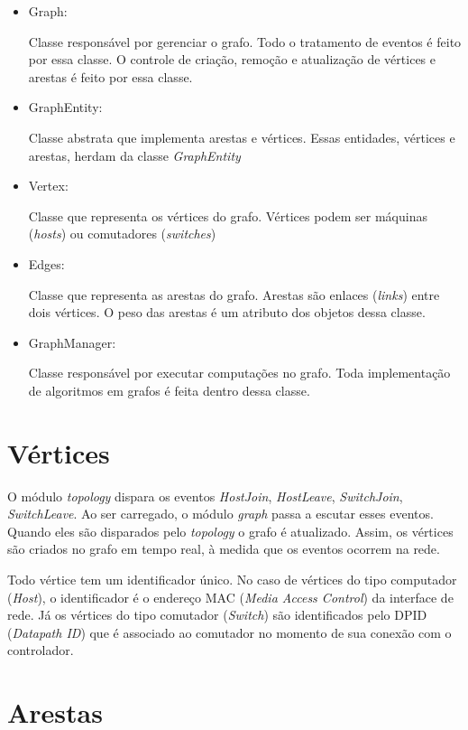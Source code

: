 \begin{itemize}
    \item{Graph}:

        Classe responsável por gerenciar o grafo.
        Todo o tratamento de eventos é feito por essa classe.
        O controle de criação, remoção e atualização de vértices e arestas
        é feito por essa classe.
    \item{GraphEntity}:

        Classe abstrata que implementa arestas e vértices.
        Essas entidades, vértices e arestas, herdam da classe
        \emph{GraphEntity}
    \item{Vertex}:

        Classe que representa os vértices do grafo.
        Vértices podem ser máquinas (\emph{hosts}) ou comutadores
        (\emph{switches})
    \item{Edges}:

        Classe que representa as arestas do grafo.
        Arestas são enlaces (\emph{links}) entre dois vértices.
        O peso das arestas é um atributo dos objetos dessa classe.
    \item{GraphManager}:

        Classe responsável por executar computações no grafo.
        Toda implementação de algoritmos em grafos é feita dentro dessa classe.
\end{itemize}

\section{Vértices}

O módulo \emph{topology} dispara os eventos \emph{HostJoin}, \emph{HostLeave},
\emph{SwitchJoin}, \emph{SwitchLeave}.
Ao ser carregado, o módulo \emph{graph} passa a escutar esses eventos.
Quando eles são disparados pelo \emph{topology} o grafo é atualizado.
Assim, os vértices são criados no grafo em tempo real, à medida que os
eventos ocorrem na rede.

Todo vértice tem um identificador único.
No caso de vértices do tipo computador (\emph{Host}), o identificador
é o endereço MAC (\emph{Media Access Control}) da interface de rede.
Já os vértices do tipo comutador (\emph{Switch}) são identificados pelo
DPID (\emph{Datapath ID}) que é associado ao comutador no momento de sua
conexão com o controlador.

\section{Arestas}

